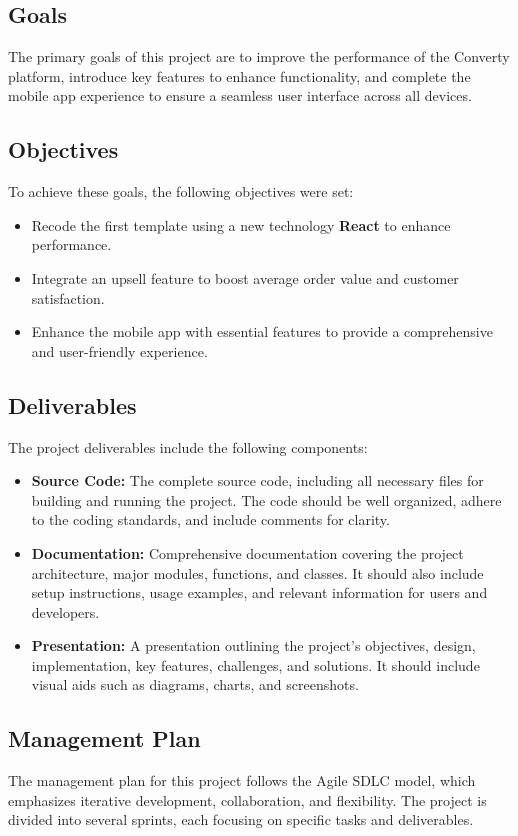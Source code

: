 \subsection{Goals}
The primary goals of this project are to improve the performance of the Converty platform, introduce key features to enhance functionality, and complete the mobile app experience to ensure a seamless user interface across all devices.

\subsection{Objectives}
To achieve these goals, the following objectives were set:
\begin{itemize}
    \item Recode the first template using a new technology \textbf{React} to enhance performance.
    \item Integrate an upsell feature to boost average order value and customer satisfaction.
    \item Enhance the mobile app with essential features to provide a comprehensive and user-friendly experience.
\end{itemize}

\subsection{Deliverables}
The project deliverables include the following components:
\begin{itemize}
    \item \textbf{Source Code:} The complete source code, including all necessary files for building and running the project. The code should be well organized, adhere to the coding standards, and include comments for clarity.
    \item \textbf{Documentation:} Comprehensive documentation covering the project architecture, major modules, functions, and classes. It should also include setup instructions, usage examples, and relevant information for users and developers.
    \item \textbf{Presentation:} A presentation outlining the project's objectives, design, implementation, key features, challenges, and solutions. It should include visual aids such as diagrams, charts, and screenshots.
\end{itemize}

\subsection{Management Plan}
The management plan for this project follows the Agile SDLC model, which emphasizes iterative development, collaboration, and flexibility. The project is divided into several sprints, each focusing on specific tasks and deliverables.

